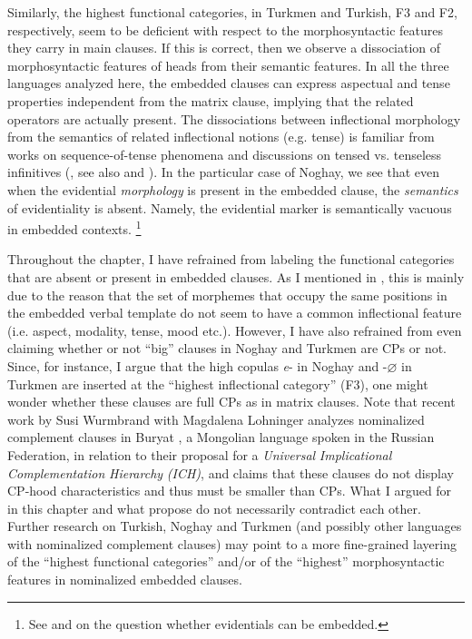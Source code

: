 \documentclass[output=paper]{langsci/langscibook}
\begin{document}
Similarly, the highest functional categories, in Turkmen and Turkish, F3 and F2, respectively, seem to be deficient with respect to the morphosyntactic features they carry in main clauses. 
If this is correct, then we observe a dissociation of morphosyntactic features of heads from their semantic features. 
In all the three languages analyzed here, the embedded clauses can express aspectual and tense properties independent from the matrix clause, implying that the related operators are actually present. 
The dissociations between inflectional morphology from the semantics of related inflectional notions (e.g. tense) is familiar from works on sequence-of-tense phenomena and discussions on tensed vs. tenseless infinitives (\citealp{Stowell1982,Wurmbrand2014}, see also \citealp{Enc1987} and \citealp{Ogihara1996}). 
In the particular case of Noghay, we see that even when the evidential \textit{morphology} is present in the embedded clause, the \textit{semantics} of evidentiality is absent. 
Namely, the evidential marker is semantically vacuous in embedded contexts.%
    \footnote{
        See \citet{Aikhenvald2004} and \citet{SchennerSauerland2007} on the question whether evidentials can be embedded.
    }

Throughout the chapter, I have refrained from labeling the functional categories that are absent or present in embedded clauses. 
As I mentioned in , this is mainly due to the reason that the set of morphemes that occupy the same positions in the embedded verbal template do not seem to have a common inflectional feature (i.e. aspect, modality, tense, mood etc.). 
However, I have also refrained from even claiming whether or not ``big'' clauses in Noghay and Turkmen are CPs or not. 
Since, for instance, I argue that the high copulas \textit{e}{}- in Noghay and -\textit{$\varnothing$} in Turkmen are inserted at the ``highest inflectional category'' (F3), one might wonder whether these clauses are full CPs as in matrix clauses. 
Note that recent work by Susi Wurmbrand with Magdalena Lohninger \citep{WurmbrandLohninger2019} analyzes nominalized complement clauses in Buryat \citep{Bondarenko2018}, a Mongolian language spoken in the Russian Federation, in relation to their proposal for a \textit{Universal} \textit{Implicational} \textit{Complementation} \textit{Hierarchy} \textit{(ICH)}, and claims that these clauses do not display CP-hood characteristics and thus must be smaller than CPs. 
What I argued for in this chapter and what \citet{WurmbrandLohninger2019} propose do not necessarily contradict each other. 
Further research on Turkish, Noghay and Turkmen (and possibly other languages with nominalized complement clauses) may point to a more fine-grained layering of the ``highest functional categories'' and/or of the ``highest'' morphosyntactic features in nominalized embedded clauses.
\end{document}
